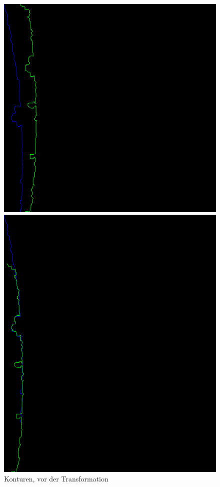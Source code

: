 \begin{figure}[h]
    \centering
    \begin{minipage}{0.49\textwidth}
        \centering
        \includegraphics[width=\textwidth]{images/before_matching.png} %
        \caption{Konturen, vor der Transformation}
        \label{fig:before_matching}
    \end{minipage}
    \begin{minipage}{0.49\textwidth}
        \centering
        \includegraphics[width=\textwidth]{images/0.24225865209471767contours.png} %

\end{minipage}
\end{figure}
